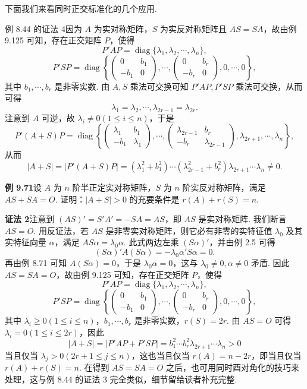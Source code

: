 \documentclass[UTF8,12pt,a4paper,fontset=fandol]{ctexart}
\begin{document}
下面我们来看同时正交标准化的几个应用.

例 8.44 的证法 4\quad 因为 $A$ 为实对称矩阵，$S$ 为实反对称矩阵且 $AS=SA$，故由例 9.125 可知，存在正交矩阵 $P$，使得
\[
P'AP=\operatorname{diag}\{\lambda_1,\lambda_2,\cdots,\lambda_n\},
\]
\[
P'SP=\operatorname{diag}\left\{
\begin{pmatrix}
0&b_1\\
-b_1&0
\end{pmatrix},\cdots,
\begin{pmatrix}
0&b_r\\
-b_r&0
\end{pmatrix},
0,\cdots,0
\right\},
\]
其中 $b_1,\cdots,b_r$ 是非零实数. 由 $A,S$ 乘法可交换可知 $P'AP,P'SP$ 乘法可交换，从而可得
\[
\lambda_1=\lambda_2,\cdots,\lambda_{2r-1}=\lambda_{2r}.
\]
注意到 $A$ 可逆，故 $\lambda_i\ne0(1\le i\le n)$，于是
\[
P'(A+S)P=\operatorname{diag}\left\{
\begin{pmatrix}
\lambda_1&b_1\\
-b_1&\lambda_1
\end{pmatrix},\cdots,
\begin{pmatrix}
\lambda_{2r-1}&b_r\\
-b_r&\lambda_{2r-1}
\end{pmatrix},
\lambda_{2r+1},\cdots,\lambda_n
\right\},
\]
从而
\[
|A+S|=|P'(A+S)P|=(\lambda_1^2+b_1^2)\cdots(\lambda_{2r-1}^2+b_r^2)\lambda_{2r+1}\cdots\lambda_n\ne0.
\]

\noindent\textbf{例 9.71}\quad 设 $A$ 为 $n$ 阶半正定实对称矩阵，$S$ 为 $n$ 阶实反对称矩阵，满足 $AS+SA=O$. 证明：$|A+S|>0$ 的充要条件是 $r(A)+r(S)=n$.

\noindent\textbf{证法 2}\quad 注意到 $(AS)'=S'A'=-SA=AS$，即 $AS$ 是实对称矩阵. 我们断言 $AS=O$. 用反证法，若 $AS$ 是非零实对称矩阵，则它必有非零的实特征值 $\lambda_0$ 及其实特征向量 $\alpha$，满足 $AS\alpha=\lambda_0\alpha$. 此式两边左乘 $(S\alpha)'$，并由例 2.5 可得
\[
(S\alpha)'A(S\alpha)=-\lambda_0\alpha'S\alpha=0.
\]
再由例 8.71 可知 $A(S\alpha)=0$，于是 $\lambda_0\alpha=0$，这与 $\lambda_0\ne0,\alpha\ne0$ 矛盾. 因此 $AS=SA=O$，故由例 9.125 可知，存在正交矩阵 $P$，使得
\[
P'AP=\operatorname{diag}\{\lambda_1,\lambda_2,\cdots,\lambda_n\},
\]
\[
P'SP=\operatorname{diag}\left\{
\begin{pmatrix}
0&b_1\\
-b_1&0
\end{pmatrix},\cdots,
\begin{pmatrix}
0&b_r\\
-b_r&0
\end{pmatrix},
0,\cdots,0
\right\},
\]
其中 $\lambda_i\ge0(1\le i\le n)$，$b_1,\cdots,b_r$ 是非零实数，$r(S)=2r$. 由 $AS=O$ 可得 $\lambda_i=0(1\le i\le2r)$，因此
\[
|A+S|=|P'AP+P'SP|=b_1^2\cdots b_r^2\lambda_{2r+1}\cdots\lambda_n>0
\]
当且仅当 $\lambda_j>0(2r+1\le j\le n)$，这也当且仅当 $r(A)=n-2r$，即当且仅当 $r(A)+r(S)=n$. 在得到 $AS=SA=O$ 之后，也可用同时酉对角化的技巧来处理，这与例 8.44 的证法 3 完全类似，细节留给读者补充完整.
\end{document}
